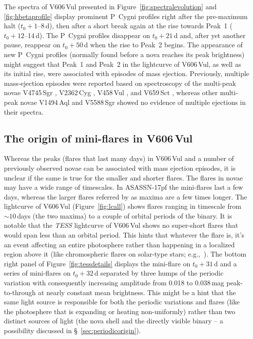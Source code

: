 \documentclass[twocolumn]{aastex631}
\newcommand{\nova}{V606\,Vul}
\begin{document}
The spectra of \nova{} presented in Figure~\ref{fig:spectralevolution} and \ref{fig:hbetaprofile} 
display prominent P~Cygni profiles right after the pre-maximum halt ($t_0 + 1$--8\,d), 
then after a short break again at the rise towards Peak~1 
($t_0 + 12$--14\,d). The P~Cygni profiles disappear on $t_0 + 21$\,d and, 
after yet another pause, reappear on $t_0 + 50$\,d when the rise to Peak~2 begins.
The appearance of new P~Cygni profiles (normally found before 
a nova reaches its peak brightness) might suggest that Peak~1 and Peak~2 in the lightcurve of \nova{}, 
as well as its initial rise, were associated with episodes of mass ejection. 
Previously, multiple mass-ejection episodes were reported based on
spectroscopy of the multi-peak novae V4745\,Sgr \citep{2005A&A...429..599C}, V2362\,Cyg \citep{2008AJ....136.1815L}, 
V458\,Vul \citep{2015ARep...59..920T}, and V659\,Sct \citep{2022MNRAS.516.4805M}, 
whereas other multi-peak novae V1494\,Aql \citep{2003A&A...404..997I} and V5588\,Sgr \citep{2015MNRAS.447.1661M} 
showed no evidence of multiple ejections in their spectra.


\subsection{The origin of mini-flares in \nova{}}
\label{sec:miniflaresorigin}

Whereas the peaks (flares that last many days) in \nova{} and a number of
previously observed novae can be associated with mass ejection episodes, 
it is unclear if the same is true for the smaller and shorter flares.
The flares in novae may have a wide range of timescales. 
In ASASSN-17pf the mini-flares last a few days, whereas 
the larger flares referred by \cite{2019arXiv190309232A}
as maxima are a few times longer. 
The lightcurve of \nova{} (Figure~\ref{fig:lcall}) shows flares ranging in
timescale from $\sim10$\,days (the two maxima) to a couple of orbital periods
of the binary. It is notable that the {\em TESS} lightcurve of \nova{} shows
no super-short flares that would span less than an orbital period. This
hints that whatever the flare is, it's an event affecting an entire 
photosphere rather than happening in a localized region above it 
(like chromospheric flares on solar-type stars; e.g.,~\citealt{2005stam.book.....G}).
The bottom right panel of Figure~\ref{fig:tessdetails} displays 
the mini-flare on $t_0+31$\,d and a series of mini-flares on $t_0+32$\,d 
separated by three humps of the periodic variation with consequently
increasing amplitude from 0.018 to 0.038\,mag peak-to-through at nearly
constant mean brightness. This might be a hint that the same light source 
is responsible for both the periodic variations and flares 
(like the photosphere that is expanding or heating non-uniformly) rather than
two distinct sources of light (the nova shell and the directly visible
binary -- a possibility discussed in \S~\ref{sec:periodicorigin}).
\end{document}
